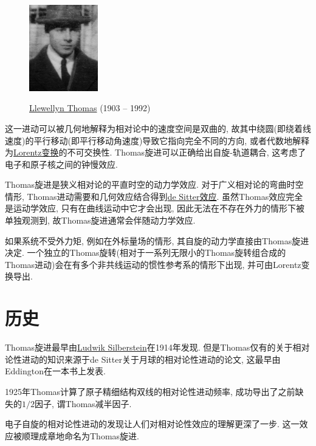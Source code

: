 \documentclass[hidelinks]{ctexart}
\begin{document}
\par
\begin{figure}
    \begin{tcolorbox}[sharp corners=all,boxrule=.3pt,colframe=lightgray,left=1mm, top=1mm, right=1mm, bottom=1mm]
        \centerline{\includegraphics[width=3cm]{src/Thomas,Llewellyn_1926_Kopenhagen.jpg}}
        \scriptsize\textsf{\href{https://en.wikipedia.org/wiki/Llewellyn_Thomas}{Llewellyn Thomas} (1903 -- 1992)}
    \end{tcolorbox}
\end{figure}
这一进动可以被几何地解释为相对论中的速度空间是双曲的, 故其中绕圆(即绕着线速度)的平行移动(即平行移动角速度)导致它指向完全不同的方向, 或者代数地解释为\href{https://en.wikipedia.org/wiki/Lorentz_transformation}{Lorentz变换}的不可交换性. Thomas旋进可以正确给出自旋-轨道耦合, 这考虑了电子和原子核之间的钟慢效应.
\par
Thomas旋进是狭义相对论的平直时空的动力学效应. 对于广义相对论的弯曲时空情形, Thomas进动需要和几何效应结合得到\href{https://en.wikipedia.org/wiki/Geodetic_effect}{de Sitter效应}. 虽然Thomas效应完全是运动学效应, 只有在曲线运动中它才会出现, 因此无法在不存在外力的情形下被单独观测到, 故Thomas旋进通常会伴随动力学效应.
\par
如果系统不受外力矩, 例如在外标量场的情形, 其自旋的动力学直接由Thomas旋进决定. 一个独立的Thomas旋转(相对于一系列无限小的Thomas旋转组合成的Thomas进动)会在有多个非共线运动的惯性参考系的情形下出现, 并可由Lorentz变换导出.

\section{历史} %
\label{sec:历史}

Thomas旋进最早由\href{https://en.wikipedia.org/wiki/Ludwik_Silberstein}{Ludwik Silberstein}在1914年发现. 但是Thomas仅有的关于相对论性进动的知识来源于de Sitter关于月球的相对论性进动的论文, 这最早由Eddington在一本书上发表.
\par
1925年Thomas计算了原子精细结构双线的相对论性进动频率, 成功导出了之前缺失的$1/2$因子, 谓Thomas减半因子.
\par
电子自旋的相对论性进动的发现让人们对相对论性效应的理解更深了一步. 这一效应被顺理成章地命名为Thomas旋进.
\end{document}
